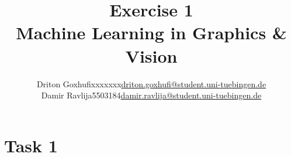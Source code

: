 \documentclass [a4paper, 11pt] {article}
\makeatletter
\newcommand{\courseName}{Machine Learning in Graphics \& Vision}
\newcommand{\homeworkNum}{1}
\newcommand{\studentOne}{Driton Goxhufi}
\newcommand{\studentTwo} {Damir Ravlija}
\newcommand{\matrikelNrStOne}{xxxxxxx}
\newcommand{\matrikelNrStTwo}{5503184}
\newcommand{\mailStOne}{driton.goxhufi@student.uni-tuebingen.de}
\newcommand{\mailStTwo}{damir.ravlija@student.uni-tuebingen.de}
\makeatother
\begin{document}
	
\title{\vspace{-1.5cm}\textbf{Exercise \homeworkNum} \\ 
	\courseName}
\author{\begin{tabular}{lcr}
		\studentOne & \matrikelNrStOne & \href{mailto:\mailStOne}{\mailStOne} \\
		\studentTwo & \matrikelNrStTwo & \href{mailto:\mailStTwo}{\mailStTwo} 
\end{tabular}}	
\date{}
\maketitle


\section{Task 1}
\end{document}
